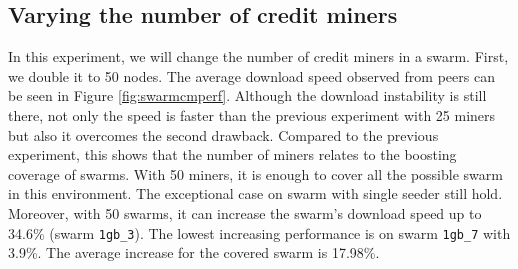 \subsection{Varying the number of credit miners}
In this experiment, we will change the number of credit miners in a swarm. First, we double it to 50 nodes. The average download speed observed from peers can be seen in Figure \ref{fig:swarmcmperf}. Although the download instability is still there, not only the speed is faster than the previous experiment with 25 miners but also it overcomes the second drawback. Compared to the previous experiment, this shows that the number of miners relates to the boosting coverage of swarms. With 50 miners, it is enough to cover all the possible swarm in this environment. The exceptional case on swarm with single seeder still hold. Moreover, with 50 swarms, it can increase the swarm's download speed up to 34.6\% (swarm \texttt{1gb\_3}). The lowest increasing performance is on swarm \texttt{1gb\_7} with 3.9\%. The average increase for the covered swarm is 17.98\%.

